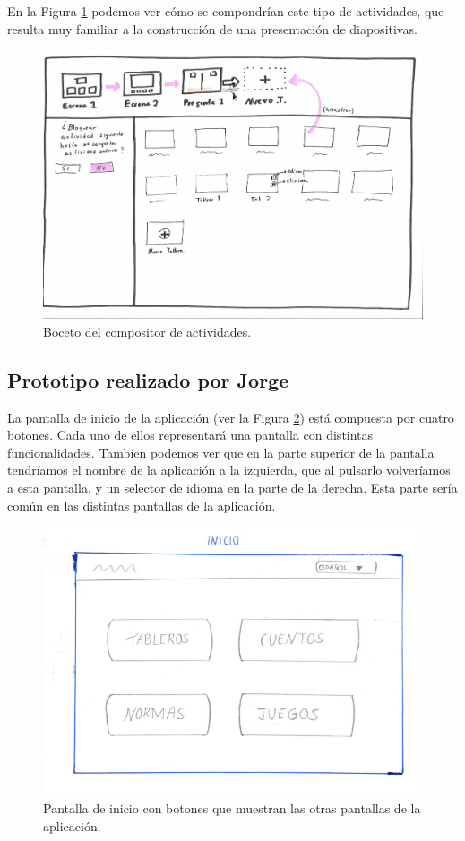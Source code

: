 En la Figura \ref{fig:presentaciontableros} podemos ver cómo se compondrían este tipo de actividades, que resulta muy familiar a la construcción de una presentación de diapositivas.

\begin{figure}[h!]
	\centering
	\includegraphics[width=0.7\linewidth]{Imagenes/Bitmap/presentacionTableros}
	\caption{Boceto del compositor de actividades.}
	\label{fig:presentaciontableros}
\end{figure}


\subsection{Prototipo realizado por Jorge}
\label{cap4:sec:prototipo}
	
	La pantalla de inicio de la aplicación (ver la Figura \ref{fig:iniciojorge}) está compuesta por cuatro botones. Cada uno de ellos representará una pantalla con distintas funcionalidades. Tambíen podemos ver que en la parte superior de la pantalla tendríamos el nombre de la aplicación a la izquierda, que al pulsarlo volveríamos a esta pantalla, y un selector de idioma en la parte de la derecha. Esta parte sería común en las distintas pantallas de la aplicación.
	
	
\begin{figure}[h!]
	\centering
	\includegraphics[width=0.7\linewidth]{Imagenes/Bitmap/inicioJorge}
	\caption{Pantalla de inicio con botones que muestran las otras pantallas de la aplicación.}
	\label{fig:iniciojorge}
\end{figure}

